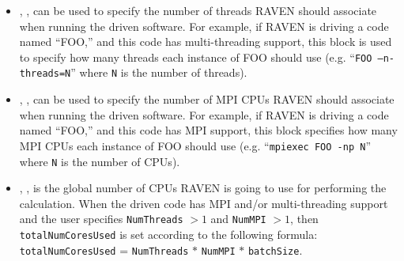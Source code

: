 \begin{itemize}
\item {}, , can be used to
specify the number of threads RAVEN should associate when running the driven
software.
%
For example, if RAVEN is driving a code named ``FOO,'' and this code has
multi-threading support, this block is used to specify how many threads each
instance of FOO should use (e.g. ``\texttt{FOO --n-threads=N}'' where \texttt{N}
 is the number of threads).
%

\item {}, , can be used to
specify the number of MPI CPUs RAVEN should associate when running the driven
software.
%
For example, if RAVEN is driving a code named ``FOO,'' and this code has MPI
support, this block specifies how many MPI CPUs each instance of FOO should use
(e.g. ``\texttt{mpiexec FOO -np N}'' where \texttt{N} is the number of CPUs).
%

\item {}, , is the
global number of CPUs RAVEN is going to use for performing the calculation.
%
When the driven code has MPI and/or multi-threading support and the user
specifies \texttt{NumThreads} $> 1$  and \texttt{NumMPI} $> 1$, then
\texttt{totalNumCoresUsed} is set according to the following formula:\\
\texttt{totalNumCoresUsed} = \texttt{NumThreads} $*$ \texttt{NumMPI} $*$
\texttt{batchSize}.
%


\end{itemize}
